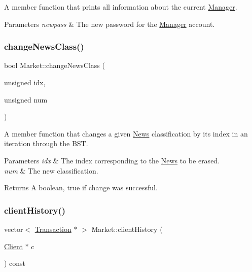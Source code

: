 A member function that prints all information about the current \hyperlink{class_manager}{Manager}. 
\begin{DoxyParams}{Parameters}
{\em newpass} & The new password for the \hyperlink{class_manager}{Manager} account. \\
\hline
\end{DoxyParams}
\hypertarget{class_market_aed66e17ba743e8aca8674c1005ca957f}{}\label{class_market_aed66e17ba743e8aca8674c1005ca957f} 
\subsubsection{\texorpdfstring{change\+News\+Class()}{changeNewsClass()}}
{\footnotesize\ttfamily bool Market\+::change\+News\+Class (\begin{DoxyParamCaption}\item[{unsigned}]{idx,  }\item[{unsigned}]{num }\end{DoxyParamCaption})}

A member function that changes a given \hyperlink{class_news}{News} classification by its index in an iteration through the B\+ST. 
\begin{DoxyParams}{Parameters}
{\em idx} & The index corresponding to the \hyperlink{class_news}{News} to be erased. \\
\hline
{\em num} & The new classification. \\
\hline
\end{DoxyParams}
\begin{DoxyReturn}{Returns}
A boolean, true if change was successful. 
\end{DoxyReturn}
\hypertarget{class_market_aecf8063cd4ed62c3a74a44960b68eb7e}{}\label{class_market_aecf8063cd4ed62c3a74a44960b68eb7e} 
\subsubsection{\texorpdfstring{client\+History()}{clientHistory()}}
{\footnotesize\ttfamily vector$<$ \hyperlink{class_transaction}{Transaction} $\ast$ $>$ Market\+::client\+History (\begin{DoxyParamCaption}\item[{\hyperlink{class_client}{Client} $\ast$}]{c }\end{DoxyParamCaption}) const}

